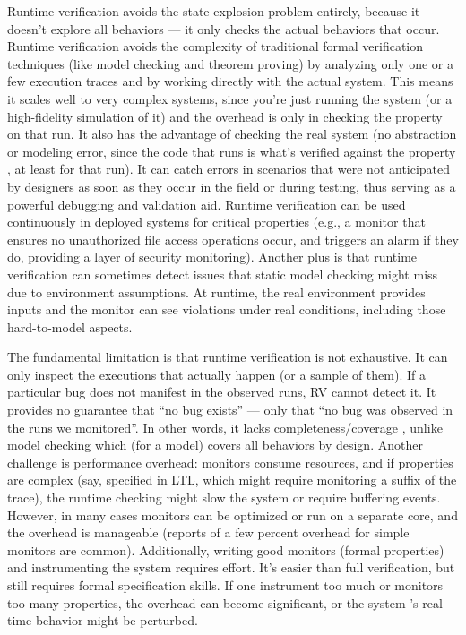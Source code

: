 Runtime verification avoids the state explosion problem entirely, because it doesn’t explore all
behaviors — it only checks the actual behaviors that occur. Runtime verification 
avoids the complexity of traditional formal verification techniques (like model 
checking and theorem proving) by analyzing only one or a few execution traces 
and by working directly with the actual system. This means it scales well to 
very complex systems, since you’re just running the system (or a
high-fidelity simulation of it) and the overhead is only in checking the property 
on that run. It also has the advantage of checking the real system (no abstraction 
or modeling error, since the code that runs is what’s verified against the property
, at least for that run). It can catch errors in scenarios that were not anticipated
by designers as soon as they occur in the field or during testing, thus serving 
as a powerful debugging and validation aid. Runtime verification can be used 
continuously in deployed systems for critical properties
(e.g., a monitor that ensures no unauthorized file access operations occur, 
and triggers an alarm if they do, providing a layer of security monitoring).
Another plus is that runtime verification can sometimes detect issues that static model checking might miss
due to environment assumptions. At runtime, the real environment provides inputs and the monitor can
see violations under real conditions, including those hard-to-model aspects.


The fundamental limitation is that runtime verification is not exhaustive. It 
can only inspect the executions that actually happen (or a sample of them). 
If a particular bug does not manifest in the observed runs, RV cannot detect 
it. It provides no guarantee that “no bug exists” — only that “no bug was
observed in the runs we monitored”. In other words, it lacks completeness/coverage
, unlike model checking which (for a model) covers all behaviors by design. 
Another challenge is performance overhead:
monitors consume resources, and if properties are complex (say, specified in 
LTL, which might require monitoring a suffix of the trace), the runtime checking 
might slow the system or require buffering events.
However, in many cases monitors can be optimized or run on a separate core, 
and the overhead is manageable (reports of a few percent overhead for simple 
monitors are common).
Additionally, writing good monitors (formal properties) and instrumenting the 
system requires effort. It’s easier than full verification, but still requires 
formal specification skills. If one instrument too much or
monitors too many properties, the overhead can become significant, or the system
’s real-time behavior might be perturbed.


